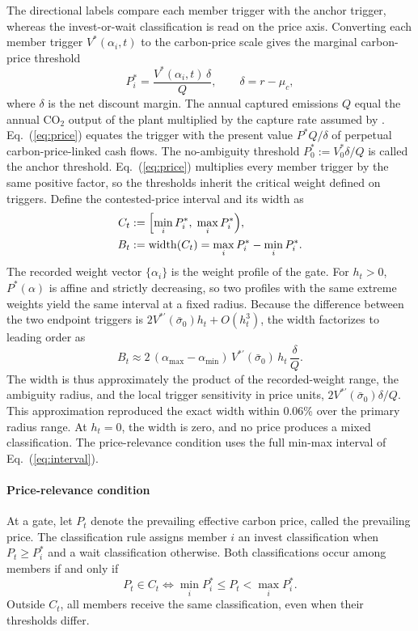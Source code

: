 \documentclass[5p,times,authoryear]{elsarticle}
\theoremstyle{plain}
\newcommand{\sbar}{\bar{\sigma}_0}
\newcommand{\Vzero}{V^{*}_{0}}
\begin{document}
The directional labels compare each member trigger with the anchor trigger, whereas the invest-or-wait classification is read on the price axis. Converting each member trigger $V^{*}(\alpha_i,t)$ to the carbon-price scale gives the marginal carbon-price threshold
\begin{equation}
P^{*}_{i}=\frac{V^{*}(\alpha_i,t)\,\delta}{Q},\qquad \delta=r-\mu_c,
\label{eq:price}
\end{equation}
where $\delta$ is the net discount margin. The annual captured emissions $Q$ equal the annual CO$_2$ output of the plant multiplied by the capture rate assumed by \citet{Sun2024}. Eq.~(\ref{eq:price}) equates the trigger with the present value $P^{*}Q/\delta$ of perpetual carbon-price-linked cash flows. The no-ambiguity threshold $P^{*}_{0}:=\Vzero\delta/Q$ is called the anchor threshold. Eq.~(\ref{eq:price}) multiplies every member trigger by the same positive factor, so the thresholds inherit the critical weight defined on triggers. Define the contested-price interval and its width as
\begin{equation}
\begin{aligned}
C_t&:=\Bigl[\min_i P^{*}_{i},\;\max_i P^{*}_{i}\Bigr),\\
B_t&:=\mathrm{width}(C_t)=\max_i P^{*}_{i}-\min_i P^{*}_{i}.
\end{aligned}
\label{eq:interval}
\end{equation}
The recorded weight vector $\{\alpha_i\}$ is the weight profile of the gate. For $h_t>0$, $P^{*}(\alpha)$ is affine and strictly decreasing, so two profiles with the same extreme weights yield the same interval at a fixed radius. Because the difference between the two endpoint triggers is $2V^{*\prime}(\sbar)h_t+O(h_t^{3})$, the width factorizes to leading order as
\begin{equation}
B_t\approx 2\,(\alpha_{\max}-\alpha_{\min})\,V^{*\prime}(\sbar)\,h_t\,\frac{\delta}{Q}.
\label{eq:width}
\end{equation}
The width is thus approximately the product of the recorded-weight range, the ambiguity radius, and the local trigger sensitivity in price units, $2V^{*\prime}(\sbar)\delta/Q$. This approximation reproduced the exact width within 0.06\% over the primary radius range. At $h_t=0$, the width is zero, and no price produces a mixed classification. The price-relevance condition uses the full min-max interval of Eq.~(\ref{eq:interval}).

\paragraph{Price-relevance condition} At a gate, let $P_t$ denote the prevailing effective carbon price, called the prevailing price. The classification rule assigns member $i$ an invest classification when $P_t\ge P^{*}_{i}$ and a wait classification otherwise. Both classifications occur among members if and only if
\begin{equation}
P_t\in C_t\iff \min_i P^{*}_{i}\le P_t<\max_i P^{*}_{i}.
\label{eq:relevance}
\end{equation}
Outside $C_t$, all members receive the same classification, even when their thresholds differ.
\end{document}
